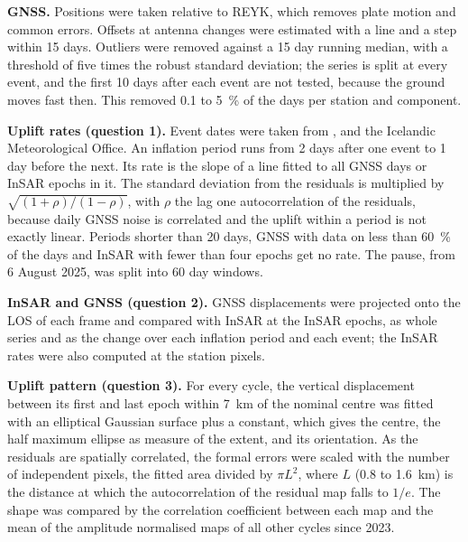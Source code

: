 \documentclass[10pt,a4paper,twocolumn]{article}
\begin{document}
\textbf{GNSS.} Positions were taken relative to REYK, which removes plate motion and common errors. Offsets at antenna changes were estimated with a line and a step within 15 days. Outliers were removed against a 15 day running median, with a threshold of five times the robust standard deviation; the series is split at every event, and the first 10 days after each event are not tested, because the ground moves fast then. This removed 0.1 to 5~\% of the days per station and component.

\textbf{Uplift rates (question 1).} Event dates were taken from \citet{parks2025}, \citet{parks2026} and the Icelandic Meteorological Office. An inflation period runs from 2 days after one event to 1 day before the next. Its rate is the slope of a line fitted to all GNSS days or InSAR epochs in it. The standard deviation from the residuals is multiplied by $\sqrt{(1+\rho)/(1-\rho)}$, with $\rho$ the lag one autocorrelation of the residuals, because daily GNSS noise is correlated and the uplift within a period is not exactly linear. Periods shorter than 20 days, GNSS with data on less than 60~\% of the days and InSAR with fewer than four epochs get no rate. The pause, from 6 August 2025, was split into 60 day windows.

\textbf{InSAR and GNSS (question 2).} GNSS displacements were projected onto the LOS of each frame and compared with InSAR at the InSAR epochs, as whole series and as the change over each inflation period and each event; the InSAR rates were also computed at the station pixels.

\textbf{Uplift pattern (question 3).} For every cycle, the vertical displacement between its first and last epoch within 7~km of the nominal centre was fitted with an elliptical Gaussian surface plus a constant, which gives the centre, the half maximum ellipse as measure of the extent, and its orientation. As the residuals are spatially correlated, the formal errors were scaled with the number of independent pixels, the fitted area divided by $\pi L^2$, where $L$ (0.8 to 1.6~km) is the distance at which the autocorrelation of the residual map falls to $1/e$. The shape was compared by the correlation coefficient between each map and the mean of the amplitude normalised maps of all other cycles since 2023.
\end{document}
